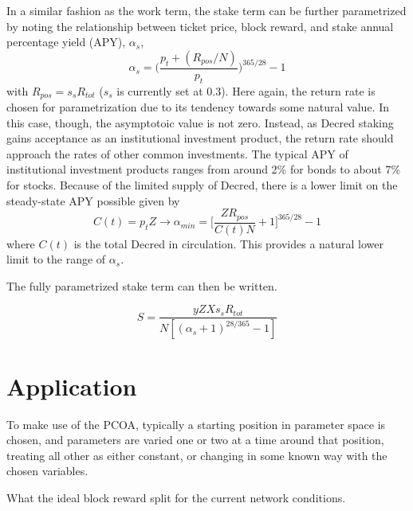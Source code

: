 \documentclass[a4paper,12pt]{article}
\begin{document}
In a similar fashion as the work term, the stake term can be further parametrized by noting the relationship between ticket price, block reward, and stake annual percentage yield (APY), $ \alpha_s $,
%
\begin{equation}
\alpha_s = \bigg( \frac{ p_t + (R_{pos} / N) }{ p_t } \bigg)^{365/28} - 1
\end{equation}
%
with $ R_{pos} = s_s R_{tot} $ ($ s_s $ is currently set at 0.3). Here again, the return rate is chosen for parametrization due to its tendency towards some natural value. In this case, though, the asymptotoic value is not zero. Instead, as Decred staking gains acceptance as an institutional investment product, the return rate should approach the rates of other common investments. The typical APY of institutional investment products ranges from around 2\% for bonds to about 7\% for stocks. Because of the limited supply of Decred, there is a lower limit on the steady-state APY possible given by 
%
\begin{equation}
C(t) = p_t Z \rightarrow \alpha_{min} = \Big[ \frac{ Z R_{pos} }{ C(t) N } + 1 \Big]^{365/28} - 1
\end{equation}
%
where $ C(t) $ is the total Decred in circulation. This provides a natural lower limit to the range of $ \alpha_s $. 


The fully parametrized stake term can then be written.

\begin{equation}
S = \frac{ yZXs_sR_{tot} }{ N [ ( \alpha_s + 1)^{28/365} - 1 ] }
\end{equation} 

\section{Application}

To make use of the PCOA, typically a starting position in parameter space is chosen, and parameters are varied one or two at a time around that position, treating all other as either constant, or changing in some known way with the chosen variables. 

What the ideal block reward split for the current network conditions. 



{}

\end{document}
